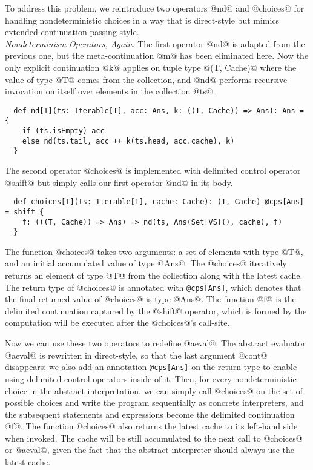 \documentclass[acmsmall, review]{acmart}\settopmatter{}
\begin{document}
To address this problem, we reintroduce two operators @nd@ and @choices@ for handling 
nondeterministic choices in a way that is direct-style but mimics extended 
continuation-passing style. \\

\textit{Nondeterminism Operators, Again.}
The first operator @nd@ is adapted from the previous one, but the meta-continuation
@m@ has been eliminated here. Now the only explicit continuation @k@ applies on tuple 
type @(T, Cache)@ where the value of type @T@ comes from the collection, and @nd@ performs 
recursive invocation on itself over elements in the collection @ts@. 

\begin{lstlisting}
  def nd[T](ts: Iterable[T], acc: Ans, k: ((T, Cache)) => Ans): Ans = {
    if (ts.isEmpty) acc
    else nd(ts.tail, acc ++ k(ts.head, acc.cache), k)
  }
\end{lstlisting}

The second operator @choices@ is implemented with delimited control operator 
@shift@ but simply calls our first operator @nd@ in its body.

\begin{lstlisting}
  def choices[T](ts: Iterable[T], cache: Cache): (T, Cache) @cps[Ans] = shift {
    f: (((T, Cache)) => Ans) => nd(ts, Ans(Set[VS](), cache), f)
  }
\end{lstlisting}

The function @choices@ takes two arguments: a set of elements with type @T@, 
and an initial accumulated value of type @Ans@.
The @choices@ iteratively returns an element of type @T@ from the collection 
along with the latest cache. The return type of @choices@ is annotated with \verb|@cps[Ans]|,
which denotes that the final returned value of @choices@ is type @Ans@.
The function @f@ is the delimited continuation captured by the @shift@ operator, which
is formed by the computation will be executed after the @choices@'s call-site.

Now we can use these two operators to redefine @aeval@. The abstract evaluator @aeval@ is
rewritten in direct-style, so that the last argument @cont@ disappears; we also add an 
annotation \verb|@cps[Ans]| on the return type to enable using delimited control operators 
inside of it.
Then, for every nondeterministic choice in the abstract interpretation, we can simply call 
@choices@ on the set of possible choices and write the program sequentially as concrete 
interpreters, and the subsequent statements and expressions become the delimited continuation
@f@. The function @choices@ also returns the latest cache to its left-hand side when invoked.
The cache will be still accumulated to the next call to @choices@ or @aeval@, 
given the fact that the abstract interpreter should always use the latest cache.
\end{document}

